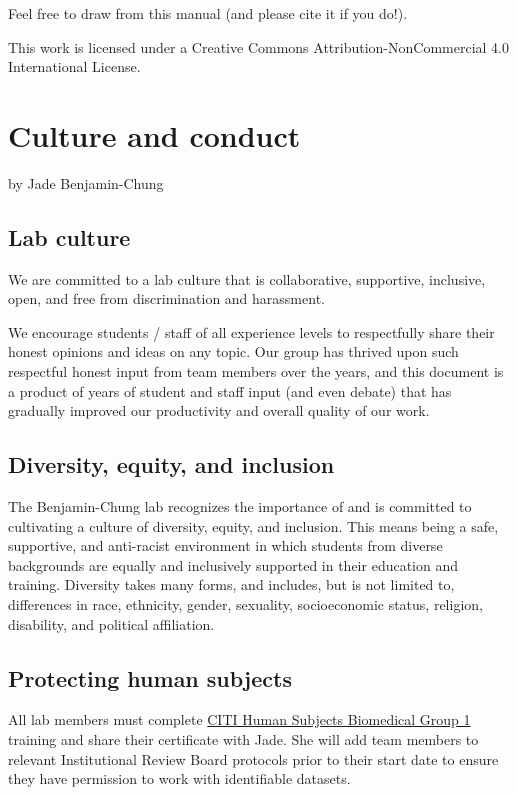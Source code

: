 \documentclass[
]{book}
\begin{document}
Feel free to draw from this manual (and please cite it if you do!).

This work is licensed under a Creative Commons Attribution-NonCommercial 4.0 International License.

\chapter{Culture and conduct}\label{culture-and-conduct}

by Jade Benjamin-Chung

\section{Lab culture}\label{lab-culture}

We are committed to a lab culture that is collaborative, supportive, inclusive, open, and free from discrimination and harassment.

We encourage students / staff of all experience levels to respectfully share their honest opinions and ideas on any topic. Our group has thrived upon such respectful honest input from team members over the years, and this document is a product of years of student and staff input (and even debate) that has gradually improved our productivity and overall quality of our work.

\section{Diversity, equity, and inclusion}\label{diversity-equity-and-inclusion}

The Benjamin-Chung lab recognizes the importance of and is committed to cultivating a culture of diversity, equity, and inclusion. This means being a safe, supportive, and anti-racist environment in which students from diverse backgrounds are equally and inclusively supported in their education and training. Diversity takes many forms, and includes, but is not limited to, differences in race, ethnicity, gender, sexuality, socioeconomic status, religion, disability, and political affiliation.

\section{Protecting human subjects}\label{protecting-human-subjects}

All lab members must complete \href{https://researchcompliance.stanford.edu/panels/hs/forms/training/citi}{CITI Human Subjects Biomedical Group 1} training and share their certificate with Jade. She will add team members to relevant Institutional Review Board protocols prior to their start date to ensure they have permission to work with identifiable datasets.
\end{document}
